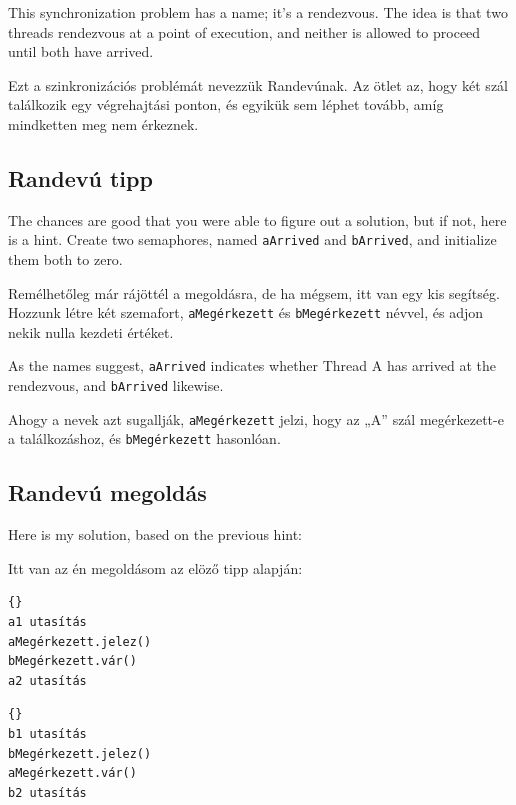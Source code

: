 \documentclass{book}
\newcommand{\clearemptydoublepage}{\newpage\cleardoublepage}
\begin{document}
This synchronization problem has a name; it's a
rendezvous.  The idea is that two threads rendezvous
at a point of execution, and neither is allowed to proceed
until both have arrived.

Ezt a szinkronizációs problémát nevezzük Randevúnak. Az ötlet az,
hogy két szál találkozik egy végrehajtási ponton, és egyikük sem léphet
tovább, amíg mindketten meg nem érkeznek.


\clearemptydoublepage
\subsection{Randevú tipp}

The chances are good that you were able to figure out a solution,
but if not, here is a hint.  Create two semaphores, named {\tt aArrived}
and {\tt bArrived}, and initialize them both to zero.

Remélhetőleg már rájöttél a megoldásra, de ha mégsem,
itt van egy kis segítség. Hozzunk létre két szemafort,
{\tt aMegérkezett} és {\tt bMegérkezett} névvel,
és adjon nekik nulla kezdeti értéket.

As the names suggest, {\tt aArrived} indicates whether Thread A
has arrived at the rendezvous, and {\tt bArrived} likewise.

Ahogy a nevek azt sugallják,  {\tt aMegérkezett} jelzi, hogy az „A” szál
megérkezett-e a találkozáshoz, és {\tt bMegérkezett} hasonlóan.

\clearemptydoublepage
\subsection{Randevú megoldás}

Here is my solution, based on the previous hint:

Itt van az én megoldásom az elöző tipp alapján:

\begin{minipage}[t]{2in}
\begin{lstlisting}[title={„A” szál}]{}
a1 utasítás
aMegérkezett.jelez()
bMegérkezett.vár()
a2 utasítás
\end{lstlisting}
\end{minipage}
\hfill
\begin{minipage}[t]{2in}
\begin{lstlisting}[title={„B” szál}]{}
b1 utasítás
bMegérkezett.jelez()
aMegérkezett.vár()
b2 utasítás
\end{lstlisting}
\end{minipage}
\end{document}

